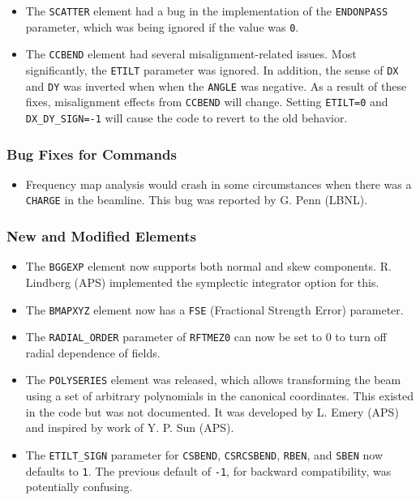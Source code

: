 \documentclass[11pt]{article}
\begin{document}
\begin{itemize}
\item The \verb|SCATTER| element had a bug in the implementation of the \verb|ENDONPASS| parameter, which was being
  ignored if the value was \verb|0|.
\item The \verb|CCBEND| element had several misalignment-related issues. Most significantly, the \verb|ETILT| parameter was ignored.
  In addition, the sense of \verb|DX| and \verb|DY| was inverted when when the \verb|ANGLE| was negative. 
  As a result of these fixes, misalignment effects from \verb|CCBEND| will change. Setting \verb|ETILT=0| and
  \verb|DX_DY_SIGN=-1| will cause the code to revert to the old behavior.
\end{itemize}

\subsubsection{Bug Fixes for Commands}
\begin{itemize}
\item Frequency map analysis would crash in some circumstances when there was a \verb|CHARGE| in the beamline.
  This bug was reported by G. Penn (LBNL).
\end{itemize}

\subsubsection{New and Modified Elements}
\begin{itemize}
\item The \verb|BGGEXP| element now supports both normal and skew components. R. Lindberg (APS) implemented the
  symplectic integrator option for this.
\item The \verb|BMAPXYZ| element now has a \verb|FSE| (Fractional Strength Error) parameter.
\item The \verb|RADIAL_ORDER| parameter of \verb|RFTMEZ0| can now be set to 0 to turn off radial dependence of
  fields.
\item The \verb|POLYSERIES| element was released, which allows transforming the beam using a set of arbitrary polynomials
  in the canonical coordinates.  This existed in the code but was not documented.
  It was developed by L. Emery (APS) and inspired by work of Y. P. Sun (APS).
\item The \verb|ETILT_SIGN| parameter for \verb|CSBEND|, \verb|CSRCSBEND|, \verb|RBEN|, and \verb|SBEN| now defaults
  to \verb|1|. The previous default of \verb|-1|, for backward compatibility, was potentially confusing.
\end{itemize}
\end{document}
